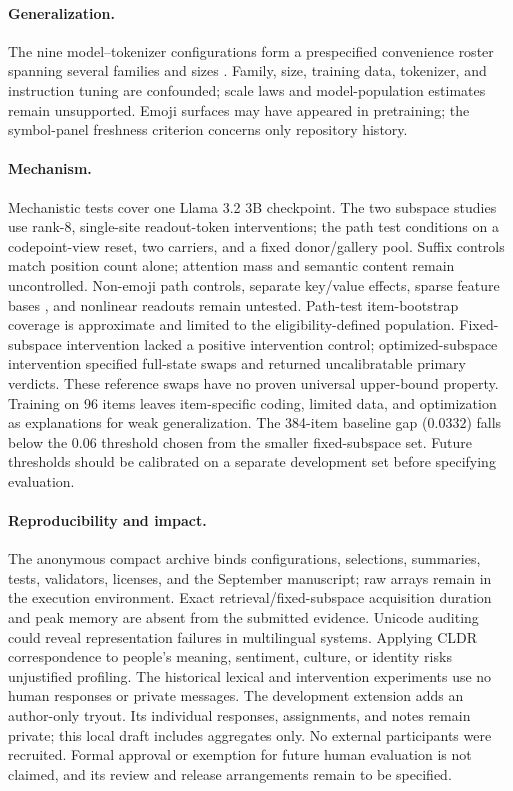 \documentclass{article}
\begin{document}
\paragraph{Generalization.}
The nine model--tokenizer configurations form a prespecified convenience roster
spanning several families and sizes \citep{yang2024qwen25,olmo2024furious,
dubey2024llama3,gemmateam2024gemma2,jiang2023mistral,benallal2025smollm2}.
Family, size, training data, tokenizer, and instruction tuning are confounded;
scale laws and model-population estimates remain unsupported. Emoji surfaces
may have appeared in pretraining; the symbol-panel
freshness criterion concerns only repository history.

\paragraph{Mechanism.}
Mechanistic tests cover one Llama 3.2 3B checkpoint. The two subspace studies use rank-8,
single-site readout-token interventions; the path test conditions on a codepoint-view
reset, two carriers, and a fixed donor/gallery pool. Suffix controls match
position count alone; attention mass and semantic content remain uncontrolled.
Non-emoji path controls, separate key/value effects, sparse feature bases
\citep{bricken2023monosemanticity,cunningham2024sparse}, and nonlinear readouts
remain untested. Path-test item-bootstrap coverage is approximate and limited to the
eligibility-defined population. Fixed-subspace intervention lacked a positive intervention control;
optimized-subspace intervention specified full-state swaps \citep{geiger2024das,wu2023boundless}
and returned uncalibratable primary verdicts. These reference swaps have no
proven universal upper-bound property. Training on 96 items leaves item-specific
coding, limited data, and optimization as explanations for weak generalization.
The 384-item baseline gap ($0.0332$) falls below the $0.06$ threshold chosen
from the smaller fixed-subspace set. Future thresholds should be calibrated on a
separate development set before specifying evaluation.

\paragraph{Reproducibility and impact.}
The anonymous compact archive binds configurations, selections, summaries,
tests, validators, licenses, and the September manuscript; raw arrays remain in the execution
environment. Exact retrieval/fixed-subspace acquisition duration and peak memory are absent from
the submitted evidence. Unicode auditing could reveal representation failures
in multilingual systems. Applying CLDR correspondence to people's meaning,
sentiment, culture, or identity risks unjustified profiling. The historical
lexical and intervention experiments use no human responses or private messages.
The development extension adds an author-only tryout. Its individual responses,
assignments, and notes remain private; this local draft includes aggregates
only. No external participants were recruited. Formal approval or exemption
for future human evaluation is not claimed, and its review and release
arrangements remain to be specified.
\end{document}
